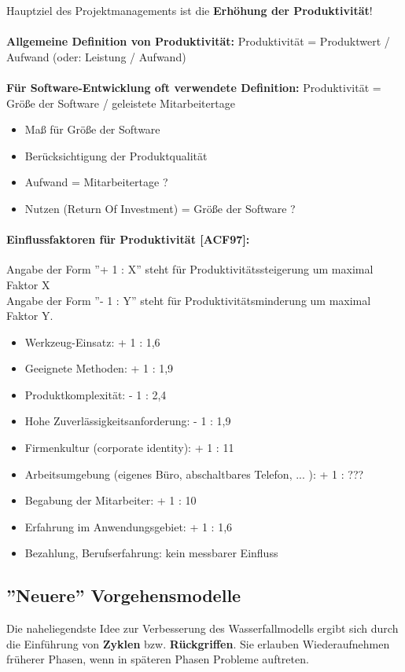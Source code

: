 Hauptziel des Projektmanagements ist die \textbf{Erhöhung der Produktivität}! 
\\ 
\\
\textbf{Allgemeine Definition von Produktivität:} Produktivität = Produktwert / Aufwand (oder: Leistung / Aufwand)
\\
\\
\textbf{Für Software-Entwicklung oft verwendete Definition:} Produktivität = Größe der Software / geleistete Mitarbeitertage
\begin{itemize}
	\item Maß für Größe der Software
	\item Berücksichtigung der Produktqualität
	\item Aufwand = Mitarbeitertage ?
	\item Nutzen (Return Of Investment) = Größe der Software ?
\end{itemize}

\paragraph{Einflussfaktoren für Produktivität [ACF97]:}
Angabe der Form ''+ 1 : X'' steht für Produktivitätssteigerung um maximal Faktor X \\
Angabe der Form ''- 1 : Y'' steht für Produktivitätsminderung um maximal Faktor Y.
\begin{itemize}
	\item Werkzeug-Einsatz: + 1 : 1,6
	\item Geeignete Methoden: + 1 : 1,9
	\item Produktkomplexität: - 1 : 2,4
	\item Hohe Zuverlässigkeitsanforderung: - 1 : 1,9
	\item Firmenkultur (corporate identity): + 1 : 11
	\item Arbeitsumgebung (eigenes Büro, abschaltbares Telefon, ... ): + 1 : ???
	\item Begabung der Mitarbeiter: + 1 : 10
	\item Erfahrung im Anwendungsgebiet: + 1 : 1,6
	\item Bezahlung, Berufserfahrung: kein messbarer Einfluss
\end{itemize}

\subsection{''Neuere'' Vorgehensmodelle}
Die naheliegendste Idee zur Verbesserung des Wasserfallmodells ergibt sich durch die Einführung von \textbf{Zyklen} bzw. \textbf{Rückgriffen}. Sie erlauben Wiederaufnehmen früherer Phasen, wenn in späteren Phasen Probleme auftreten.
